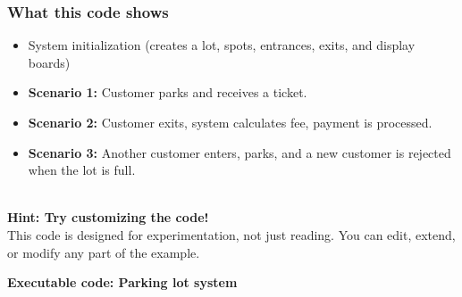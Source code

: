 \subsubsection{What this code shows}\label{6mk22RnDFZ6wTCfNGY21H}

\begin{itemize}
\item
\protect{}\label{mbPCt4sWYC2_u_yU80neL}
System initialization (creates a lot, spots, entrances, exits, and display boards)
\item
\protect{}\label{3R70WZtPXUHV6EVuLQPCD}
\textbf{Scenario 1:} Customer parks and receives a ticket.
\item
\protect{}\label{WyoYC5bRAMidNqXCQMMeG}
\textbf{Scenario 2:} Customer exits, system calculates fee, payment is processed.
\item
\protect{}\label{0DtU_CVR7G2E4dtnUCB_m}
\textbf{Scenario 3:} Another customer enters, parks, and a new customer is rejected when the lot is full.
\end{itemize}
\\
\textbf{Hint: Try customizing the code!}
\\
This code is designed for experimentation, not just reading. You can edit, extend, or modify any part of the example.

\textbf{Executable code: Parking lot system}

